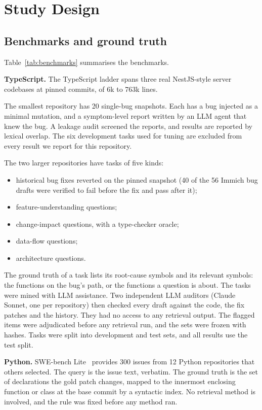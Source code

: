 \documentclass[sigconf,nonacm]{acmart}
\begin{document}
\section{Study Design}
\label{sec:design}

\subsection{Benchmarks and ground truth}

Table~\ref{tab:benchmarks} summarises the benchmarks.

\textbf{TypeScript.} The TypeScript ladder spans three real NestJS-style server codebases at pinned commits, of 6k to 763k lines.

The smallest repository has 20 single-bug snapshots. Each has a bug injected as a minimal mutation, and a symptom-level report written by an LLM agent that knew the bug. A leakage audit screened the reports, and results are reported by lexical overlap. The six development tasks used for tuning are excluded from every result we report for this repository.

The two larger repositories have tasks of five kinds:
\begin{itemize}
\item historical bug fixes reverted on the pinned snapshot (40 of the 56 Immich bug drafts were verified to fail before the fix and pass after it);
\item feature-understanding questions;
\item change-impact questions, with a type-checker oracle;
\item data-flow questions;
\item architecture questions.
\end{itemize}

The ground truth of a task lists its root-cause symbols and its relevant symbols: the functions on the bug's path, or the functions a question is about. The tasks were mined with LLM assistance. Two independent LLM auditors (Claude Sonnet, one per repository) then checked every draft against the code, the fix patches and the history. They had no access to any retrieval output. The flagged items were adjudicated before any retrieval run, and the sets were frozen with hashes. Tasks were split into development and test sets, and all results use the test split.

\textbf{Python.} SWE-bench Lite~\cite{jimenez2024swebench} provides 300 issues from 12 Python repositories that others selected. The query is the issue text, verbatim. The ground truth is the set of declarations the gold patch changes, mapped to the innermost enclosing function or class at the base commit by a syntactic index. No retrieval method is involved, and the rule was fixed before any method ran.
\end{document}
